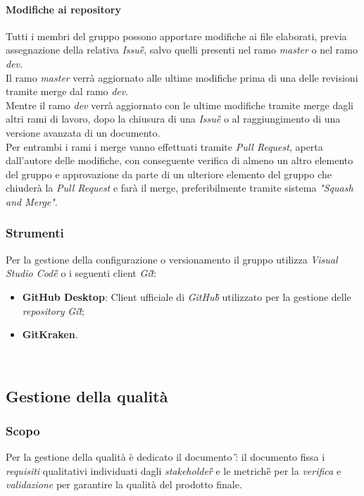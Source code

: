 		\paragraph*{Modifiche ai repository}
		\aCapo{}  
		Tutti i membri del gruppo possono apportare modifiche ai file elaborati, previa assegnazione della relativa \textit{Issue\G{}}, salvo quelli presenti nel ramo \textit{master} o nel ramo \textit{dev}. \\
		 Il ramo \textit{master} verrà aggiornato alle ultime modifiche prima di una delle revisioni tramite merge dal ramo \textit{dev}. \\
		Mentre il ramo \textit{dev} verrà aggiornato con le ultime modifiche tramite merge dagli altri rami di lavoro, dopo la chiusura di una \textit{Issue\G{}} o al raggiungimento di una versione avanzata di un documento. \\
		Per entrambi i rami i merge vanno effettuati tramite \textit{Pull Request}, aperta dall'autore delle modifiche, con conseguente verifica di almeno un altro elemento del gruppo e approvazione da parte di un ulteriore elemento del gruppo che chiuderà la \textit{Pull Request} e farà il merge, preferibilmente tramite sistema \textit{"Squash and Merge"}.
		
		\subsubsection{Strumenti}
			Per la gestione della configurazione o versionamento il gruppo utilizza \emph{Visual Studio Code\G{}} o i seguenti client \emph{Git\G}:
				
				\begin{itemize}
					\item \textbf{GitHub Desktop}: Client ufficiale di \emph{GitHub\G{}} utilizzato per la gestione delle \emph{repository} \emph{Git\G};
					\item \textbf{GitKraken}.
				\end{itemize}\
		
		\subsection{Gestione della qualità}
			\subsubsection{Scopo}
				Per la gestione della qualità è dedicato il documento \PdQ{}\G: il documento fissa i \emph{requisiti} qualitativi individuati dagli \emph{stakeholder\G{}} e le metriche\G{} per la \emph{verifica} e \emph{validazione} per garantire la qualità del prodotto finale.
		
